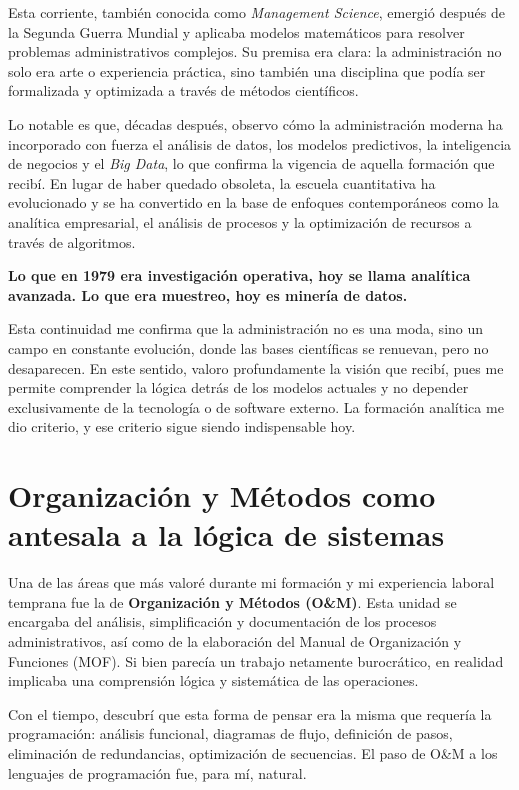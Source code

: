\documentclass[a4paper,12pt]{article}
\begin{document}
	Esta corriente, también conocida como \textit{Management Science}, emergió después de la Segunda Guerra Mundial y aplicaba modelos matemáticos para resolver problemas administrativos complejos. Su premisa era clara: la administración no solo era arte o experiencia práctica, sino también una disciplina que podía ser formalizada y optimizada a través de métodos científicos.
	
	Lo notable es que, décadas después, observo cómo la administración moderna ha incorporado con fuerza el análisis de datos, los modelos predictivos, la inteligencia de negocios y el \textit{Big Data}, lo que confirma la vigencia de aquella formación que recibí. En lugar de haber quedado obsoleta, la escuela cuantitativa ha evolucionado y se ha convertido en la base de enfoques contemporáneos como la analítica empresarial, el análisis de procesos y la optimización de recursos a través de algoritmos.
	
	\textbf{Lo que en 1979 era investigación operativa, hoy se llama analítica avanzada. Lo que era muestreo, hoy es minería de datos.}
	
	Esta continuidad me confirma que la administración no es una moda, sino un campo en constante evolución, donde las bases científicas se renuevan, pero no desaparecen. En este sentido, valoro profundamente la visión que recibí, pues me permite comprender la lógica detrás de los modelos actuales y no depender exclusivamente de la tecnología o de software externo. La formación analítica me dio criterio, y ese criterio sigue siendo indispensable hoy.

\section*{Organización y Métodos como antesala a la lógica de sistemas}

Una de las áreas que más valoré durante mi formación y mi experiencia laboral temprana fue la de \textbf{Organización y Métodos (O\&M)}. Esta unidad se encargaba del análisis, simplificación y documentación de los procesos administrativos, así como de la elaboración del Manual de Organización y Funciones (MOF). Si bien parecía un trabajo netamente burocrático, en realidad implicaba una comprensión lógica y sistemática de las operaciones.

Con el tiempo, descubrí que esta forma de pensar era la misma que requería la programación: análisis funcional, diagramas de flujo, definición de pasos, eliminación de redundancias, optimización de secuencias. El paso de O\&M a los lenguajes de programación fue, para mí, natural.
\end{document}
